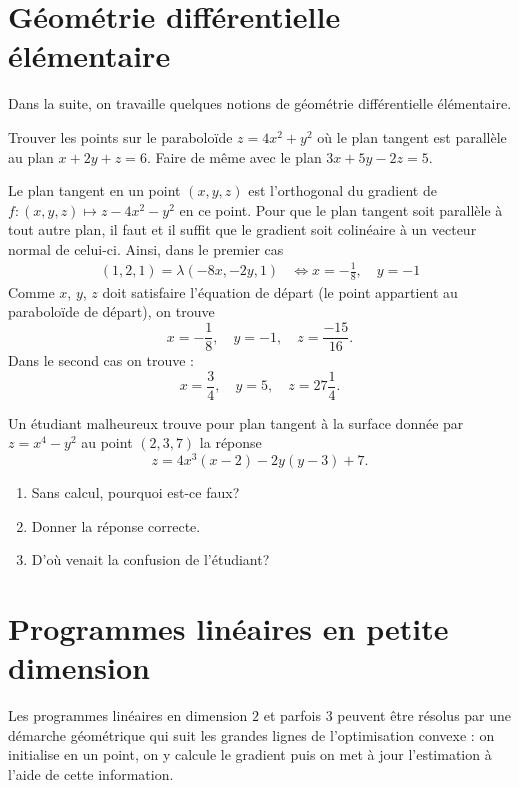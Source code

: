 \documentclass[11pt, a4paper]{article}
\begin{document}
\section{Géométrie différentielle élémentaire}

Dans la suite, on travaille quelques notions de géométrie
différentielle élémentaire.

\begin{question}
  Trouver les points sur le paraboloïde $z = 4x^2 + y^2$ où le plan
  tangent est parallèle au plan $x + 2y + z = 6$. Faire de même avec le plan
  $3x + 5y -2z = 5$.
\end{question}
\begin{solution}
  Le plan tangent en un point $(x, y, z)$ est l'orthogonal du gradient
  de $f : (x, y, z) \mapsto z - 4x^2 - y^2$ en ce point. Pour que le
  plan tangent soit parallèle à tout autre plan, il faut et il suffit
  que le gradient soit colinéaire à un vecteur normal de
  celui-ci. Ainsi, dans le premier cas
  \begin{align}
    (1, 2, 1) = \lambda(-8x, -2y, 1) & \Longleftrightarrow x = -\frac{1}{8}, \quad y = -1
  \end{align}
  Comme $x$, $y$, $z$ doit satisfaire l'équation de départ (le point
  appartient au paraboloïde de départ), on trouve
  \[
  x = -\frac{1}{8}, \quad y = -1, \quad z = \frac{-15}{16}.
  \]
  Dans le second cas on trouve :
  \[
  x = \frac{3}{4}, \quad y = 5, \quad z = 27\frac{1}{4}.
  \]
\end{solution}

\begin{question}
  Un étudiant malheureux trouve pour plan tangent à la surface donnée
  par $z = x^4-y^2$ au point $(2, 3, 7)$ la réponse
  \[
  z = 4x^3(x-2) - 2y(y-3) + 7.
  \]
  \begin{enumerate}
  \item Sans calcul, pourquoi est-ce faux?
  \item Donner la réponse correcte.
  \item D'où venait la confusion de l'étudiant?
  \end{enumerate}
\end{question}

\section{Programmes linéaires en petite dimension}

Les programmes linéaires en dimension $2$ et parfois $3$ peuvent être
résolus par une démarche géométrique qui suit les grandes lignes de
l'optimisation convexe : on initialise en un point, on y calcule le
gradient puis on met à jour l'estimation à l'aide de cette
information.
\end{document}

